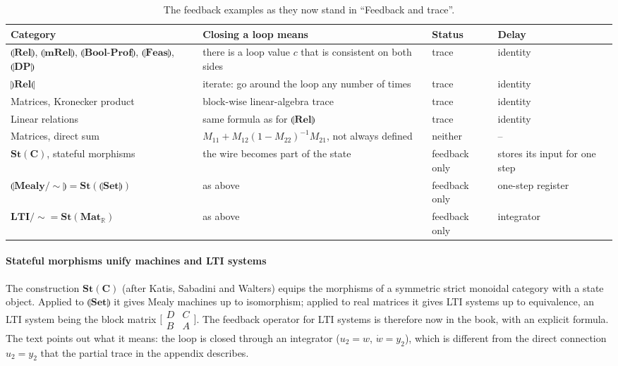 \documentclass[11pt,a4paper]{article}
\newcommand{\cat}[1]{\mathbf{#1}}
\newcommand{\tL}[1]{\llparenthesis\mathbf{#1}\rrparenthesis}   %
\newcommand{\tR}[1]{\rrparenthesis\mathbf{#1}\llparenthesis}   %
\newcommand{\St}{\mathbf{St}}
\newcommand{\R}{\mathbb{R}}
\begin{document}
\begin{table}[h]
\centering\small
\begin{tabularx}{\textwidth}{@{}P{43mm}LP{20mm}P{33mm}@{}}
\toprule
\textbf{Category} & \textbf{Closing a loop means} & \textbf{Status} & \textbf{Delay}\\
\midrule
$\tL{Rel}$, $\tL{mRel}$, $\tL{Bool\text{-}Prof}$, $\tL{Feas}$, $\tL{DP}$ & there is a loop value $c$ that is consistent on both sides & trace & identity\\
$\tR{Rel}$ & iterate: go around the loop any number of times & trace & identity\\
Matrices, Kronecker product & block-wise linear-algebra trace & trace & identity\\
Linear relations & same formula as for $\tL{Rel}$ & trace & identity\\
Matrices, direct sum & $M_{11} + M_{12}(1 - M_{22})^{-1}M_{21}$, not always defined & neither & --\\
$\St(\cat{C})$, stateful morphisms & the wire becomes part of the state & feedback only & stores its input for one step\\
$\tL{Mealy/{\sim}} = \St(\tL{Set})$ & as above & feedback only & one-step register\\
$\cat{LTI}/{\sim} = \St(\cat{Mat}_\R)$ & as above & feedback only & integrator\\
\bottomrule
\end{tabularx}
\caption{The feedback examples as they now stand in ``Feedback and trace''.}
\end{table}

\paragraph{Stateful morphisms unify machines and LTI systems} The construction $\St(\cat{C})$
(after Katis, Sabadini and Walters) equips the morphisms of a symmetric strict monoidal category
with a state object. Applied to $\tL{Set}$ it gives Mealy machines up to isomorphism; applied to
real matrices it gives LTI systems up to equivalence, an LTI system being the block matrix
$\bigl[\begin{smallmatrix} D & C\\ B & A\end{smallmatrix}\bigr]$. The feedback operator for LTI
systems is therefore now in the book, with an explicit formula. The text points out what it
means: the loop is closed through an integrator ($u_2 = w$, $\dot w = y_2$), which is different
from the direct connection $u_2 = y_2$ that the partial trace in the appendix describes.
\end{document}

